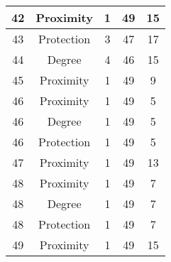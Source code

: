 \documentclass[results.tex]{subfiles}
\begin{document}
\begin{center}
\begin{tabular}{| c || c | c | c | c |}
            \hline
            42                      & Proximity                    & 1                      & 49                      & 15                   \\
            \hline
            43                      & Protection                   & 3                      & 47                      & 17                   \\
            \hline
            44                      & Degree                       & 4                      & 46                      & 15                   \\
            \hline
            45                      & Proximity                    & 1                      & 49                      & 9                    \\
            \hline
            46                      & Proximity                    & 1                      & 49                      & 5                    \\
            \hline
            46                      & Degree                       & 1                      & 49                      & 5                    \\
            \hline
            46                      & Protection                   & 1                      & 49                      & 5                    \\
            \hline
            47                      & Proximity                    & 1                      & 49                      & 13                   \\
            \hline
            48                      & Proximity                    & 1                      & 49                      & 7                    \\
            \hline
            48                      & Degree                       & 1                      & 49                      & 7                    \\
            \hline
            48                      & Protection                   & 1                      & 49                      & 7                    \\
            \hline
            49                      & Proximity                    & 1                      & 49                      & 15                   \\
            \hline
        \end{tabular}
    \end{center}
\end{document}
